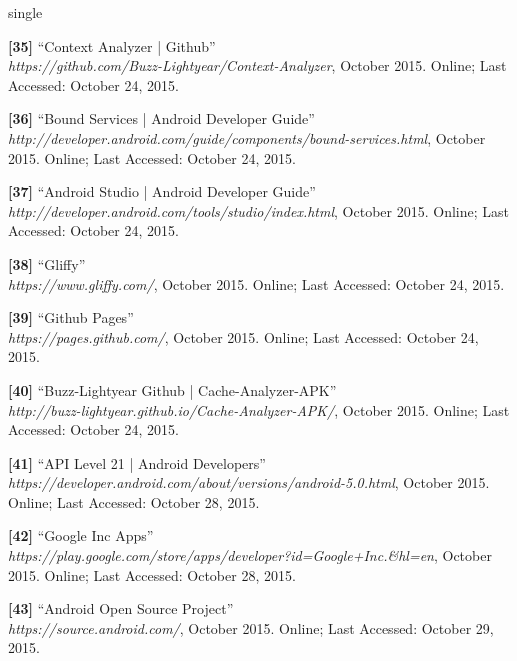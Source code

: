 \documentclass[12pt]{uthesis-v12}  %
\begin{document}
\begin{referencelist}{single}
	\item \textbf{[35]} ``Context Analyzer | Github''
	\\\emph{https://github.com/Buzz-Lightyear/Context-Analyzer}, October 2015. 
	Online; Last Accessed: October 24, 2015.
	
	\item \textbf{[36]} ``Bound Services | Android Developer Guide''
	\\\emph{http://developer.android.com/guide/components/bound-services.html}, October 2015. 
	Online; Last Accessed: October 24, 2015.	
	
	\item \textbf{[37]} ``Android Studio | Android Developer Guide''
	\\\emph{http://developer.android.com/tools/studio/index.html}, October 2015. 
	Online; Last Accessed: October 24, 2015.
											
	\item \textbf{[38]} ``Gliffy''
	\\\emph{https://www.gliffy.com/}, October 2015. 
	Online; Last Accessed: October 24, 2015.
							
	\item \textbf{[39]} ``Github Pages''
	\\\emph{https://pages.github.com/}, October 2015. 
	Online; Last Accessed: October 24, 2015.
	
	\item \textbf{[40]} ``Buzz-Lightyear Github | Cache-Analyzer-APK''
	\\\emph{http://buzz-lightyear.github.io/Cache-Analyzer-APK/}, October 2015. 
	Online; Last Accessed: October 24, 2015.
	
	\item \textbf{[41]} ``API Level 21 | Android Developers''
	\\\emph{https://developer.android.com/about/versions/android-5.0.html}, October 2015. 
	Online; Last Accessed: October 28, 2015.	
	
	\item \textbf{[42]} ``Google Inc Apps''
	\\\emph{https://play.google.com/store/apps/developer?id=Google+Inc.\&hl=en}, October 2015. 
	Online; Last Accessed: October 28, 2015.
											
	\item \textbf{[43]} ``Android Open Source Project''
	\\\emph{https://source.android.com/}, October 2015. 
	Online; Last Accessed: October 29, 2015.


\end{referencelist}
\end{document}
